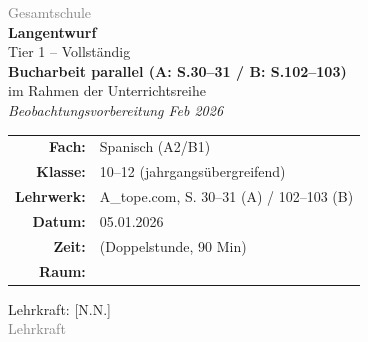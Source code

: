 \documentclass[11pt,a4paper]{article}
\newcommand{\fach}{Spanisch}
\newcommand{\jahrgangsstufe}{10--12}
\newcommand{\schulart}{Gesamtschule}
\newcommand{\stundenthema}{Bucharbeit parallel (A: S.30--31 / B: S.102--103)}
\newcommand{\reihenthema}{Beobachtungsvorbereitung Feb 2026}
\newcommand{\unterrichtsdatum}{05.01.2026}
\newcommand{\lehrkraft}{[N.N.]}
\newcommand{\ausbildungsstand}{Lehrkraft}
\newcommand{\gerniveau}{A2/B1}
\newcommand{\lehrwerk}{A\_tope.com}
\newcommand{\lehrwerkseite}{S. 30--31 (A) / 102--103 (B)}
\begin{document}
\begin{titlepage}
    \centering
    \vspace*{2cm}

    {\large\textcolor{gray}{\schulart}}\\[2cm]

    {\Huge\textcolor{fach}{\textbf{Langentwurf}}}\\[0.5cm]
    {\large Tier 1 -- Vollständig}\\[2cm]

    {\LARGE\textbf{\stundenthema}}\\[0.5cm]
    {\large im Rahmen der Unterrichtsreihe}\\[0.3cm]
    {\Large\textit{\reihenthema}}\\[2cm]

    \begin{tabular}{rl}
        \textbf{Fach:} & \fach{} (\gerniveau) \\[0.3cm]
        \textbf{Klasse:} & \jahrgangsstufe{} (jahrgangsübergreifend) \\[0.3cm]
        \textbf{Lehrwerk:} & \lehrwerk, \lehrwerkseite \\[0.3cm]
        \textbf{Datum:} & \unterrichtsdatum \\[0.3cm]
        \textbf{Zeit:} & \underline{\hspace{3cm}} (Doppelstunde, 90 Min) \\[0.3cm]
        \textbf{Raum:} & \underline{\hspace{3cm}} \\[0.3cm]
    \end{tabular}

    \vfill

    {\large Lehrkraft: \lehrkraft}\\[0.3cm]
    {\normalsize\textcolor{gray}{\ausbildungsstand}}\\[1cm]

\end{titlepage}

\tableofcontents
\newpage

\end{document}
